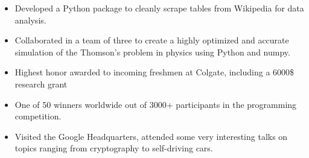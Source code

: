 \documentclass[a4paper]{resume}
\begin{document}
\begin{itemize} \vspace{-5pt} \itemsep -2pt
	\item Developed a Python package to cleanly scrape tables from Wikipedia for data analysis. 
\end{itemize}
\enresubsection
{}
\begin{itemize} \vspace{-5pt} \itemsep -2pt
	\item Collaborated in a team of three to create a highly optimized and accurate simulation of the Thomson’s problem in physics using Python and numpy. 
\end{itemize}
\enresection

\begin{itemize} \vspace{-5pt} \itemsep -2pt
	\item Highest honor awarded to incoming freshmen at Colgate, including a 6000\$ research grant
\end{itemize}
\enresubsection
{}
\begin{itemize} \vspace{-5pt} \itemsep -2pt
	\item One of 50 winners worldwide out of 3000+ participants in the programming competition.
	\item Visited the Google Headquarters, attended some very interesting talks on topics ranging from cryptography to self-driving cars.
\end{itemize}
\enresection
\end{document}
